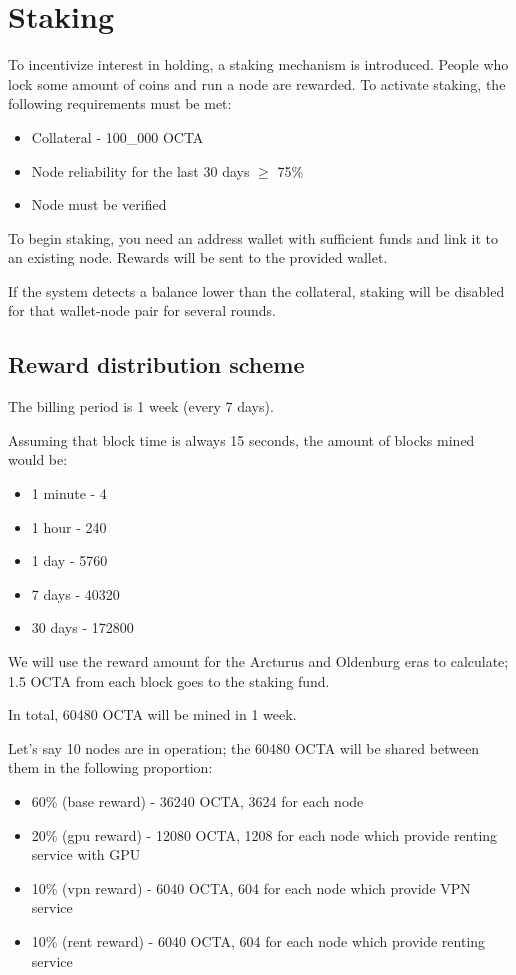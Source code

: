 \section{Staking}
\label{sec:staking}

To incentivize interest in holding, a staking mechanism is introduced. People who lock some amount of coins and run a node are rewarded. To activate staking, the following requirements must be met:

\begin{itemize}
    \item Collateral - 100\_000 OCTA
    \item Node reliability for the last 30 days $\ge$ 75\%
    \item Node must be verified
\end{itemize}

To begin staking, you need an address wallet with sufficient funds and link it to an existing node. Rewards will be sent to the provided wallet.

If the system detects a balance lower than the collateral, staking will be disabled for that wallet-node pair for several rounds.

\subsection{Reward distribution scheme}

The billing period is 1 week (every 7 days).

Assuming that block time is always 15 seconds, the amount of blocks mined would be:

\begin{itemize}
    \item 1 minute - 4
    \item 1 hour - 240
    \item 1 day - 5760
    \item 7 days - 40320
    \item 30 days - 172800
\end{itemize}

We will use the reward amount for the Arcturus and Oldenburg eras to calculate; 1.5 OCTA from each block goes to the staking fund.

In total, 60480 OCTA will be mined in 1 week.

Let's say 10 nodes are in operation; the 60480 OCTA will be shared between them in the following proportion:

\begin{itemize}
    \item 60\% (base reward) - 36240 OCTA, 3624 for each node
    \item 20\% (gpu reward) - 12080 OCTA, 1208 for each node which provide renting service with GPU
    \item 10\% (vpn reward) - 6040 OCTA, 604 for each node which provide VPN service
    \item 10\% (rent reward) - 6040 OCTA, 604 for each node which provide renting service
\end{itemize}

